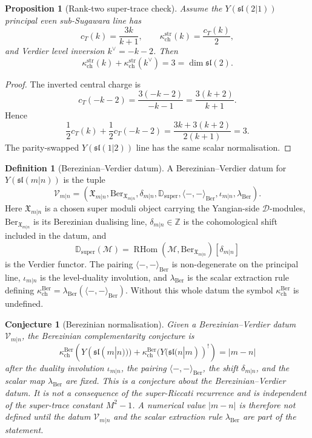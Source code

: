 \documentclass[11pt]{amsart}
\providecommand{\fsl}{\mathfrak{sl}}
\providecommand{\Ber}{\mathrm{Ber}}
\providecommand{\str}{\mathrm{str}}
\newtheorem{proposition}[theorem]{Proposition}
\newtheorem{conjecture}[theorem]{Conjecture}
\theoremstyle{definition}
\newtheorem{definition}[theorem]{Definition}
\theoremstyle{remark}
\begin{document}
\begin{proposition}[Rank-two super-trace check]
Assume the \(Y(\fsl(2|1))\) principal even sub-Sugawara line has
\[
        c_T(k)=\frac{3k}{k+1},
        \qquad
        \kappa_{\mathrm{ch}}^{\str}(k)=\frac{c_T(k)}{2},
\]
and Verdier level inversion \(k^\vee=-k-2\). Then
\[
        \kappa_{\mathrm{ch}}^{\str}(k)
        +
        \kappa_{\mathrm{ch}}^{\str}(k^\vee)
        =
        3
        =
        \dim\fsl(2).
\]
\end{proposition}

\begin{proof}
The inverted central charge is
\[
        c_T(-k-2)
        =
        \frac{3(-k-2)}{-k-1}
        =
        \frac{3(k+2)}{k+1}.
\]
Hence
\[
        \frac12c_T(k)+\frac12c_T(-k-2)
        =
        \frac{3k+3(k+2)}{2(k+1)}
        =
        3 .
\]
The parity-swapped \(Y(\fsl(1|2))\) line has the same scalar
normalisation.
\end{proof}

\begin{definition}[Berezinian--Verdier datum]
A Berezinian--Verdier datum for \(Y(\fsl(m|n))\) is the tuple
\[
        \mathcal V_{m|n}
        =
        (\mathfrak X_{m|n},
         \Ber_{\mathfrak X_{m|n}},
         \delta_{m|n},
         \mathbb D_{\mathrm{super}},
         \langle-,-\rangle_{\Ber},
         \iota_{m|n},
         \lambda_{\Ber}) .
\]
Here \(\mathfrak X_{m|n}\) is a chosen super moduli object carrying the
Yangian-side \(\mathcal D\)-modules, \(\Ber_{\mathfrak X_{m|n}}\) is its
Berezinian dualising line, \(\delta_{m|n}\in\mathbb Z\) is the
cohomological shift included in the datum, and
\[
        \mathbb D_{\mathrm{super}}(\mathcal M)
        =
        \operatorname{RHom}(\mathcal M,\Ber_{\mathfrak X_{m|n}})
        [\delta_{m|n}]
\]
is the Verdier functor. The pairing
\(\langle-,-\rangle_{\Ber}\) is non-degenerate on the principal line,
\(\iota_{m|n}\) is the level-duality involution, and
\(\lambda_{\Ber}\) is the scalar extraction rule defining
\(\kappa_{\mathrm{ch}}^{\Ber}=\lambda_{\Ber}
(\langle-,-\rangle_{\Ber})\). Without this whole datum the symbol
\(\kappa_{\mathrm{ch}}^{\Ber}\) is undefined.
\end{definition}

\begin{conjecture}[Berezinian normalisation]
Given a Berezinian--Verdier datum \(\mathcal V_{m|n}\), the Berezinian
complementarity conjecture is
\[
        \kappa_{\mathrm{ch}}^{\Ber}(Y(\fsl(m|n)))
        +
        \kappa_{\mathrm{ch}}^{\Ber}(Y(\fsl(n|m))^!)
        =
        |m-n|
\]
after the duality involution \(\iota_{m|n}\), the pairing
\(\langle-,-\rangle_{\Ber}\), the shift \(\delta_{m|n}\), and the scalar
map \(\lambda_{\Ber}\) are fixed. This is a conjecture about the
Berezinian--Verdier datum. It is not a consequence of the super-Riccati
recurrence and is independent of the super-trace constant \(M^2-1\).
A numerical value \(|m-n|\) is therefore not defined until the datum
\(\mathcal V_{m|n}\) and the scalar extraction rule \(\lambda_{\Ber}\)
are part of the statement.
\end{conjecture}
\end{document}
